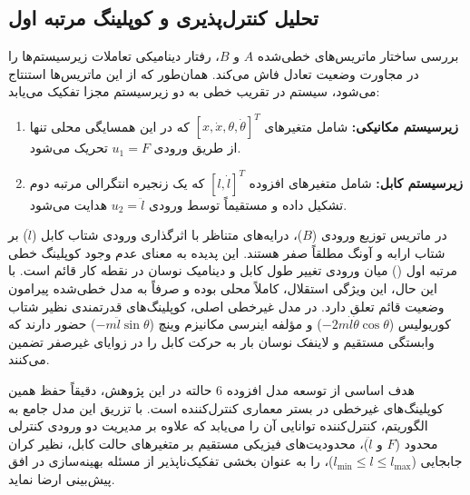 \subsection{تحلیل کنترل‌پذیری و کوپلینگ مرتبه اول}

بررسی ساختار ماتریس‌های خطی‌شده $A$ و $B$، رفتار دینامیکی تعاملات زیرسیستم‌ها را در مجاورت وضعیت تعادل فاش می‌کند. همان‌طور که از این ماتریس‌ها استنتاج می‌شود، سیستم در تقریب خطی به دو زیرسیستم مجزا تفکیک می‌یابد:
\begin{enumerate}
    \item \textbf{زیرسیستم مکانیکی:} شامل متغیرهای $[x, \dot{x}, \theta, \dot{\theta}]^T$ که در این همسایگی محلی تنها از طریق ورودی $u_1 = F$ تحریک می‌شود.
    \item \textbf{زیرسیستم کابل:} شامل متغیرهای افزوده $[l, \dot{l}]^T$ که یک زنجیره انتگرالی مرتبه دوم تشکیل داده و مستقیماً توسط ورودی $u_2 = \ddot{l}$ هدایت می‌شود.
\end{enumerate}

در ماتریس توزیع ورودی ($B$)، درایه‌های متناظر با اثرگذاری ورودی شتاب کابل ($\ddot{l}$) بر شتاب ارابه و آونگ مطلقاً صفر هستند. این پدیده به معنای عدم وجود کوپلینگ خطی مرتبه اول () میان ورودی تغییر طول کابل و دینامیک نوسان در نقطه کار قائم است. با این حال، این ویژگی استقلال، کاملاً محلی بوده و صرفاً به مدل خطی‌شده پیرامون وضعیت قائم تعلق دارد. در مدل غیرخطی اصلی، کوپلینگ‌های قدرتمندی نظیر شتاب کوریولیس ($-2m \dot{l} \dot{\theta} \cos \theta$) و مؤلفه اینرسی مکانیزم وینچ ($-m \ddot{l} \sin \theta$) حضور دارند که وابستگی مستقیم و لاینفک نوسان بار به حرکت کابل را در زوایای غیرصفر تضمین می‌کنند.

هدف اساسی از توسعه مدل افزوده $6$ حالته در این پژوهش، دقیقاً حفظ همین کوپلینگ‌های غیرخطی در بستر معماری کنترل‌کننده است. با تزریق این مدل جامع به الگوریتم، کنترل‌کننده توانایی آن را می‌یابد که علاوه بر مدیریت دو ورودی کنترلی محدود ($F$ و $\ddot{l}$)، محدودیت‌های فیزیکی مستقیم بر متغیرهای حالت کابل، نظیر کران جابجایی ($l_{\min} \le l \le l_{\max}$)، را به عنوان بخشی تفکیک‌ناپذیر از مسئله بهینه‌سازی در افق پیش‌بینی ارضا نماید.